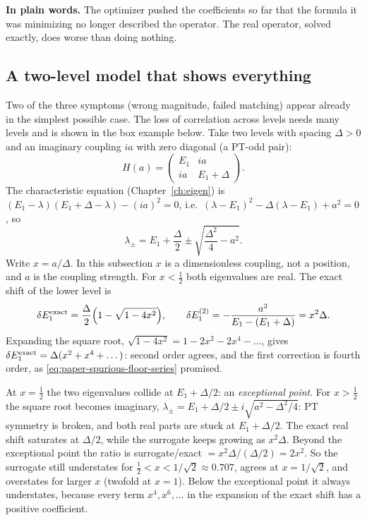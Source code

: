 \textbf{In plain words.} The optimizer pushed the coefficients so far that the formula it was minimizing no longer described the operator. The real operator, solved exactly, does worse than doing nothing.

\subsection{A two-level model that shows everything}

Two of the three symptoms (wrong magnitude, failed matching) appear already in the simplest possible case. The loss of correlation across levels needs many levels and is shown in the box example below. Take two levels with spacing $\Delta>0$ and an imaginary coupling $ia$ with zero diagonal (a PT-odd pair):
\begin{equation}
H(a)=\begin{pmatrix}E_1&ia\\ia&E_1+\Delta\end{pmatrix}.\label{eq:paper-spurious-floor-2x2}
\end{equation}
The characteristic equation (Chapter~\ref{ch:eigen}) is $(E_1-\lambda)(E_1+\Delta-\lambda)-(ia)^2=0$, i.e.\ $(\lambda-E_1)^2-\Delta(\lambda-E_1)+a^2=0$, so
\begin{equation}
\lambda_\pm=E_1+\frac\Delta2\pm\sqrt{\frac{\Delta^2}{4}-a^2}.\label{eq:paper-spurious-floor-2x2eig}
\end{equation}
Write $x=a/\Delta$. In this subsection $x$ is a dimensionless coupling, not a position, and $a$ is the coupling strength. For $x<\tfrac12$ both eigenvalues are real. The exact shift of the lower level is
\begin{equation}
\delta E_1^{\rm exact}=\frac\Delta2\Big(1-\sqrt{1-4x^2}\Big),\qquad
\delta E_1^{(2)}=-\frac{a^2}{E_1-(E_1+\Delta)}=x^2\Delta .\label{eq:paper-spurious-floor-2x2shift}
\end{equation}
Expanding the square root, $\sqrt{1-4x^2}=1-2x^2-2x^4-\dots$, gives $\delta E_1^{\rm exact}=\Delta(x^2+x^4+\dots)$: second order agrees, and the first correction is fourth order, as \cref{eq:paper-spurious-floor-series} promised.

At $x=\tfrac12$ the two eigenvalues collide at $E_1+\Delta/2$: an \emph{exceptional point}. For $x>\tfrac12$ the square root becomes imaginary, $\lambda_\pm=E_1+\Delta/2\pm i\sqrt{a^2-\Delta^2/4}$: PT symmetry is broken, and both real parts are stuck at $E_1+\Delta/2$. The exact real shift saturates at $\Delta/2$, while the surrogate keeps growing as $x^2\Delta$. Beyond the exceptional point the ratio is surrogate/exact $=x^2\Delta/(\Delta/2)=2x^2$. So the surrogate still understates for $\tfrac12<x<1/\sqrt2\approx0.707$, agrees at $x=1/\sqrt2$, and overstates for larger $x$ (twofold at $x=1$). Below the exceptional point it always understates, because every term $x^4,x^6,\dots$ in the expansion of the exact shift has a positive coefficient.

